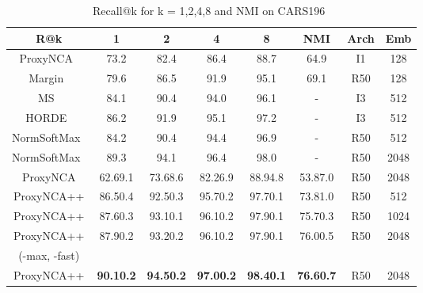 \documentclass[runningheads]{llncs}
\begin{document}
\begin{table}[htb]
\centering
\caption{Recall@k for k = 1,2,4,8 and NMI on CARS196~\cite{KrauseStarkDengFei-Fei_3DRR2013}}
\setlength{\tabcolsep}{2pt}
\begin{tabular}{|*8c|}
\hline
R@k & 1 & 2 & 4 & 8 & NMI & Arch & Emb\\ \hline
\small{ProxyNCA~\cite{movshovitz2017no}} & 73.2 & 82.4 & 86.4 & 88.7 & 64.9 &\small{I1}&\small{128}\\
\small{Margin~\cite{wu2017sampling}} & 79.6 & 86.5 & 91.9 & 95.1 & 69.1 & \small{R50}&\small{128}\\
\small{MS~\cite{wang2019multi}}& 84.1 & 90.4 & 94.0 & 96.1 & - &\small{I3}&\small{512}\\
\small{HORDE~\cite{jacob2019metric}}& 86.2 & 91.9 & 95.1 & 97.2 & - & \small{I3}&\small{512}\\
\small{NormSoftMax~\cite{zhai2019}}& 84.2 & 90.4 & 94.4 & 96.9 & - & \small{R50}&\small{512}\\
\small{NormSoftMax~\cite{zhai2019}}& 89.3 & 94.1 & 96.4 & 98.0 & - & \small{R50}&\small{2048}\\
\hline
\small{ProxyNCA}& 62.69.1 & 73.68.6 & 82.26.9 & 88.94.8 & 53.87.0 & \small{R50}&\small{2048}\\
\small{ProxyNCA++}& 86.50.4 & 92.50.3 & 95.70.2 & 97.70.1 & 73.81.0 & \small{R50}&\small{512}\\
\small{ProxyNCA++}& 87.60.3 & 93.10.1 & 96.10.2 & 97.90.1 & 75.70.3 & \small{R50}&\small{1024}\\
\small{ProxyNCA++}& 87.90.2 & 93.20.2 & 96.10.2 & 97.90.1 & 76.00.5 & \small{R50}&\small{2048}\\
\small{(-max, -fast)}& & & & & & & \\
\small{ProxyNCA++}& \textbf{90.10.2} & \textbf{94.50.2} & \textbf{97.00.2} & \textbf{98.40.1} & \textbf{76.60.7} & \small{R50}&\small{2048}\\
\hline
\end{tabular}
\label{table:cars}
\end{table}
\end{document}
